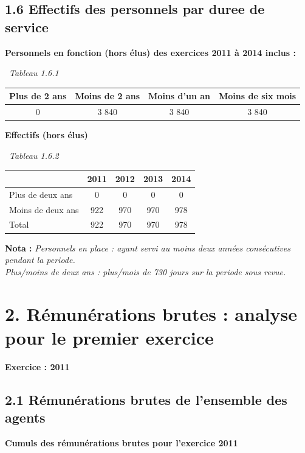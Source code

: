 \hypertarget{effectifs-des-personnels-par-duree-de-service}{%
\subsection{1.6 Effectifs des personnels par duree de
service}\label{effectifs-des-personnels-par-duree-de-service}}

\textbf{Personnels en fonction (hors élus) des exercices 2011 à 2014
inclus :}

~\emph{Tableau 1.6.1}

\begin{longtable}[]{@{}cccc@{}}
\toprule
Plus de 2 ans & Moins de 2 ans & Moins d'un an & Moins de six
mois\tabularnewline
\midrule
\endhead
0 & 3 840 & 3 840 & 3 840\tabularnewline
\bottomrule
\end{longtable}

\textbf{Effectifs (hors élus)}

~\emph{Tableau 1.6.2}

\begin{longtable}[]{@{}lcccc@{}}
\toprule
& 2011 & 2012 & 2013 & 2014\tabularnewline
\midrule
\endhead
Plus de deux ans & 0 & 0 & 0 & 0\tabularnewline
Moins de deux ans & 922 & 970 & 970 & 978\tabularnewline
Total & 922 & 970 & 970 & 978\tabularnewline
\bottomrule
\end{longtable}

\textbf{Nota :} \emph{Personnels en place : ayant servi au moins deux
années consécutives pendant la periode.}\\
\emph{Plus/moins de deux ans : plus/mois de 730 jours sur la periode
sous revue.}

\hypertarget{remunerations-brutes-analyse-pour-le-premier-exercice}{%
\section{2. Rémunérations brutes : analyse pour le premier
exercice}\label{remunerations-brutes-analyse-pour-le-premier-exercice}}

\textbf{Exercice : 2011 }

\hypertarget{remunerations-brutes-de-lensemble-des-agents}{%
\subsection{2.1 Rémunérations brutes de l'ensemble des
agents}\label{remunerations-brutes-de-lensemble-des-agents}}

\textbf{Cumuls des rémunérations brutes pour l'exercice 2011 }

